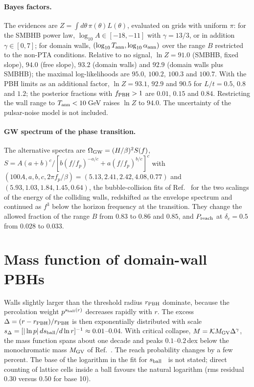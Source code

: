 \documentclass[aps,prd,onecolumn,superscriptaddress,nofootinbib,floatfix]{revtex4-2}
\newcommand{\fpbh}{f_{\rm PBH}}
\begin{document}
\paragraph*{Bayes factors.}
The evidences are $Z=\int d\theta\,\pi(\theta)L(\theta)$, evaluated on grids with uniform $\pi$: for the SMBHB power law, $\log_{10}A\in[-18,-11]$ with $\gamma=13/3$, or in addition $\gamma\in[0,7]$; for domain walls, $(\log_{10}T_{\rm ann},\log_{10}\alpha_{\rm ann})$ over the range $B$ restricted to the non-PTA conditions. Relative to no signal, $\ln Z=91.0$ (SMBHB, fixed slope), $94.0$ (free slope), $93.2$ (domain walls) and $92.9$ (domain walls plus SMBHB); the maximal log-likelihoods are $95.0$, $100.2$, $100.3$ and $100.7$. With the PBH limits as an additional factor, $\ln Z=93.1$, $92.9$ and $90.5$ for $L/t=0.5$, $0.8$ and $1.2$; the posterior fractions with $\fpbh>1$ are $0.01$, $0.15$ and $0.84$. Restricting the wall range to $T_{\rm ann}<10$\,GeV raises $\ln Z$ to $94.0$. The uncertainty of the pulsar-noise model is not included.

\paragraph*{GW spectrum of the phase transition.}\label{sec:fopt-gw}
The alternative spectra are $\Omega_{\rm GW}=(H/\beta)^2S(f)$, $S=A(a+b)^c/[b(f/f_p)^{-a/c}+a(f/f_p)^{b/c}]^c$ with $(100A,a,b,c,2\pi f_p/\beta)=(5.13,2.41,2.42,4.08,0.77)$ and $(5.93,1.03,1.84,1.45,0.64)$, the bubble-collision fits of Ref.~\cite{Lewicki:2022pdb} for the two scalings of the energy of the colliding walls, redshifted as the envelope spectrum and continued as $f^3$ below the horizon frequency at the transition. They change the allowed fraction of the range $B$ from $0.83$ to $0.86$ and $0.85$, and $P_{\rm reach}$ at $\delta_c=0.5$ from $0.028$ to $0.033$.

\section{Mass function of domain-wall PBHs}\label{sec:dw}

Walls slightly larger than the threshold radius $r_{\rm PBH}$ dominate, because the percolation weight $p^{s_{\rm ball}(r)}$ decreases rapidly with $r$. The excess $\Delta=(r-r_{\rm PBH})/r_{\rm PBH}$ is then exponentially distributed with scale $s_\Delta=[|\ln p|\,ds_{\rm ball}/d\ln r]^{-1}\approx0.01$--$0.04$. With critical collapse, $M=\mathcal{K}M_{\rm GV}\Delta^{\gamma}$, the mass function spans about one decade and peaks $0.1$--$0.2$\,dex below the monochromatic mass $M_{\rm GV}$ of Ref.~\cite{Gouttenoire:2023ftk}. The reach probability changes by a few percent. The base of the logarithm in the fit for $s_{\rm ball}$~\cite{Gouttenoire:2023gbn} is not stated; direct counting of lattice cells inside a ball favours the natural logarithm (rms residual $0.30$ versus $0.50$ for base 10).
\end{document}
